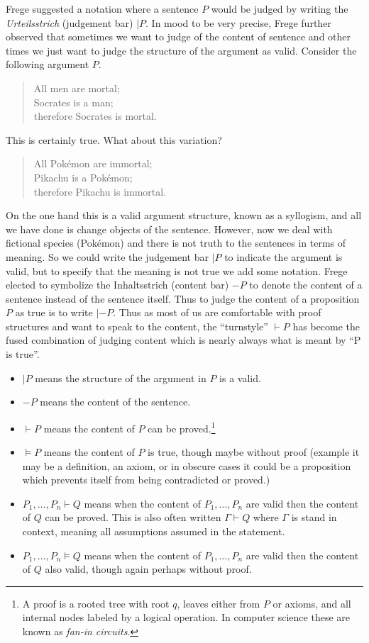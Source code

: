 Frege suggested a notation where a sentence $P$ would be judged by writing the
\emph{Urteilsstrich} (judgement bar) $|P$.  In mood to be very precise,
Frege further observed that sometimes we want to judge of the content of sentence 
and other times we just want to judge the structure of the argument as valid.
Consider the following argument $P$.
\begin{quote}
    All men are mortal; \\
    Socrates is a man;\\
    therefore Socrates is mortal.
\end{quote}
This is certainly true.  What about this variation?
\begin{quote}
    All Pok\'emon are immortal; \\
    Pikachu is a Pok\'emon;\\
    therefore Pikachu is immortal.
\end{quote}
On the one hand 
this is a valid argument structure, known as a syllogism,
and all we have done is change objects of the sentence.  
However, now we deal with fictional species (Pok\'emon) and 
there is not truth to the sentences in terms of meaning.
So we could write the judgement bar $|P$ to indicate the argument is valid,
but to specify that the meaning is not true we add some notation.
Frege elected to symbolize the Inhaltsstrich (content bar)
$-P$ to denote the content of a sentence instead of the sentence itself.  
Thus to judge the content of a proposition $P$ as true is to write $|-P$.
Thus as most of us are comfortable with proof structures and want to speak 
to the content, the ``turnstyle'' $\vdash P$ has become the fused combination 
of judging content which is nearly always what is meant by ``P is true''.





\begin{itemize}
    \item $|P$ means the structure of the argument in $P$ is a valid.
    \item $-P$ means the content of the sentence.
    \item $\vdash P$ means the content of $P$ can be proved.\footnote{A proof is
    a rooted tree with root $q$, leaves either from $P$ or axioms, and all
    internal nodes labeled by a logical operation.  In computer science these
    are known as \emph{fan-in circuits}.} 
    \item $\vDash P$ means the content of $P$ is true, though maybe without proof
    (example it may be a definition, an axiom, or in obscure cases 
    it could be a proposition which prevents itself from being contradicted 
    or proved.)

    \item $P_1,\ldots,P_n \vdash Q$ means when the content of $P_1,\ldots,P_n$ are valid 
    then the content of $Q$ can be proved.  This is also often written 
    $\Gamma \vdash Q$ where $\Gamma$ is stand in context, meaning all 
    assumptions assumed in the statement.
    \item $P_1,\ldots,P_n \vDash Q$ means when the content of $P_1,\ldots,P_n$ are valid 
    then the content of $Q$ also valid, though again perhaps without proof.
\end{itemize}